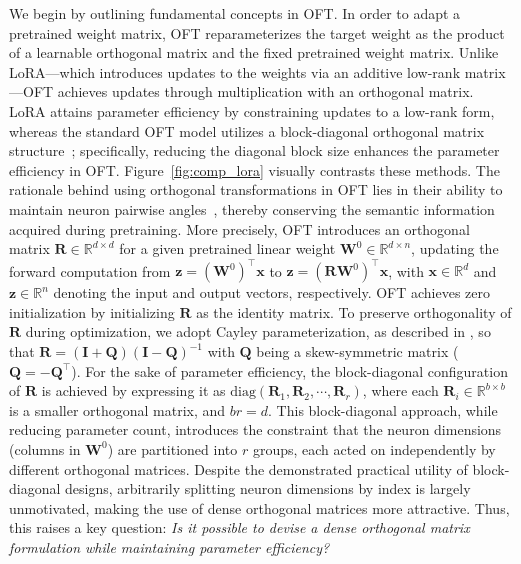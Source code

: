 We begin by outlining fundamental concepts in OFT. In order to adapt a pretrained weight matrix, OFT reparameterizes the target weight as the product of a learnable orthogonal matrix and the fixed pretrained weight matrix. Unlike LoRA—which introduces updates to the weights via an additive low-rank matrix—OFT achieves updates through multiplication with an orthogonal matrix. LoRA attains parameter efficiency by constraining updates to a low-rank form, whereas the standard OFT model utilizes a block-diagonal orthogonal matrix structure~\cite{qiu2023controlling}; specifically, reducing the diagonal block size enhances the parameter efficiency in OFT. Figure~\ref{fig:comp_lora} visually contrasts these methods. The rationale behind using orthogonal transformations in OFT lies in their ability to maintain neuron pairwise angles~\cite{liu2018learning,liu2021orthogonal,qiu2023controlling}, thereby conserving the semantic information acquired during pretraining. More precisely, OFT introduces an orthogonal matrix $\bm{R}\in\mathbb{R}^{d\times d}$ for a given pretrained linear weight $\bm{W}^0\in\mathbb{R}^{d\times n}$, updating the forward computation from $\bm{z}=(\bm{W}^0)^\top\bm{x}$ to $\bm{z}=(\bm{R}\bm{W}^0)^\top\bm{x}$, with $\bm{x}\in\mathbb{R}^d$ and $\bm{z}\in\mathbb{R}^n$ denoting the input and output vectors, respectively. OFT achieves zero initialization by initializing $\bm{R}$ as the identity matrix. To preserve orthogonality of $\bm{R}$ during optimization, we adopt Cayley parameterization, as described in \cite{qiu2023controlling,liu2021orthogonal}, so that $\bm{R}=(\bm{I}+\bm{Q})(\bm{I}-\bm{Q})^{-1}$ with $\bm{Q}$ being a skew-symmetric matrix ($\bm{Q}=-\bm{Q}^\top$). For the sake of parameter efficiency, the block-diagonal configuration of $\bm{R}$ is achieved by expressing it as $\text{diag}(\bm{R}_1,\bm{R}_2,\cdots,\bm{R}_r)$, where each $\bm{R}_i\in\mathbb{R}^{b\times b}$ is a smaller orthogonal matrix, and $br=d$. This block-diagonal approach, while reducing parameter count, introduces the constraint that the neuron dimensions (columns in $\bm{W}^0$) are partitioned into $r$ groups, each acted on independently by different orthogonal matrices. Despite the demonstrated practical utility of block-diagonal designs, arbitrarily splitting neuron dimensions by index is largely unmotivated, making the use of dense orthogonal matrices more attractive. Thus, this raises a key question: \emph{Is it possible to devise a dense orthogonal matrix formulation while maintaining parameter efficiency?}

